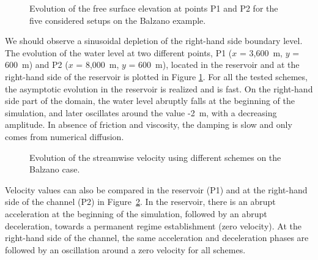 \begin{figure}[H]
\begin{minipage}[t]{0.5\textwidth}
 \centering
\end{minipage}%
\begin{minipage}[t]{0.5\textwidth}
 \centering
\end{minipage}
\caption{Evolution of the free surface elevation at points P1 and P2 for the five considered setups on the Balzano example.}
\label{fig:balzano:temporalSL}
\end{figure}

We should observe a sinusoidal depletion of the right-hand side boundary level.
The evolution of the water level at two different points, P1 ($x$ = 3,600~m, $y$ = 600~m)
and P2 ($x$ = 8,000~m, $y$ = 600~m), located in the reservoir and at the
right-hand side of the reservoir is plotted in Figure \ref{fig:balzano:temporalSL}.
For all the tested schemes, the asymptotic evolution in the reservoir is
realized and is fast.
On the right-hand side part of the domain, the water level abruptly falls at the
beginning of the simulation, and later oscillates around the value -2~m,
with a decreasing amplitude. In absence of friction and viscosity, the damping
is slow and only comes from numerical diffusion.

\begin{figure}[H]
\begin{minipage}[t]{0.5\textwidth}
 \centering
\end{minipage}%
\begin{minipage}[t]{0.5\textwidth}
 \centering
\end{minipage}
\caption{Evolution of the streamwise velocity using different schemes on the Balzano case.}
\label{fig:balzano:temporalU}
\end{figure}

Velocity values can also be compared in the reservoir (P1) and at the right-hand
side of the channel (P2) in Figure~\ref{fig:balzano:temporalU}.
In the reservoir, there is an abrupt acceleration at the beginning of the
simulation, followed by an
abrupt deceleration, towards a permanent regime establishment (zero velocity).
At the right-hand side of the channel, the same acceleration and deceleration
phases are followed by an oscillation around a zero velocity for all schemes.

